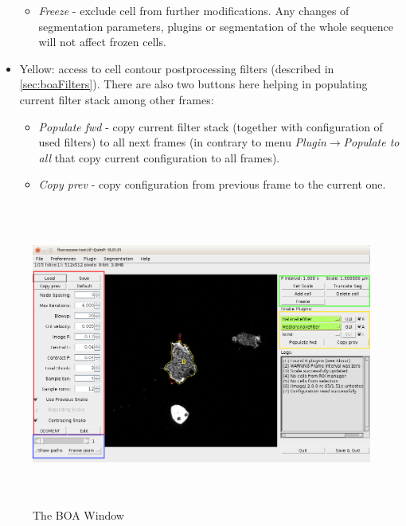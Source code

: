 \documentclass[a4paper,12pt]{article}
\begin{document}
\begin{itemize}
\begin{itemize}
		\item \textit{Freeze} - exclude cell from further modifications. Any changes of segmentation parameters, plugins or segmentation of the whole sequence will not affect frozen cells.
	\end{itemize}
	\item Yellow: access to cell contour postprocessing filters (described in \autoref{sec:boaFilters}). There are also two buttons here helping in populating current filter stack among other frames:
	\begin{itemize}
		\item \textit{Populate fwd} - copy current filter stack (together with configuration of used filters) to all next frames (in contrary to menu \textit{Plugin}$\rightarrow$\textit{Populate to all} that copy current configuration to all frames).
		\item \textit{Copy prev} - copy configuration from previous frame to the current one.
	\end{itemize}
\end{itemize}

\begin{figure}[ht]
	\centering
	\includegraphics[height=10cm]{boaWindow.png}
	\caption{The BOA Window}
	\label{boaWindow}
\end{figure}
\end{document}
